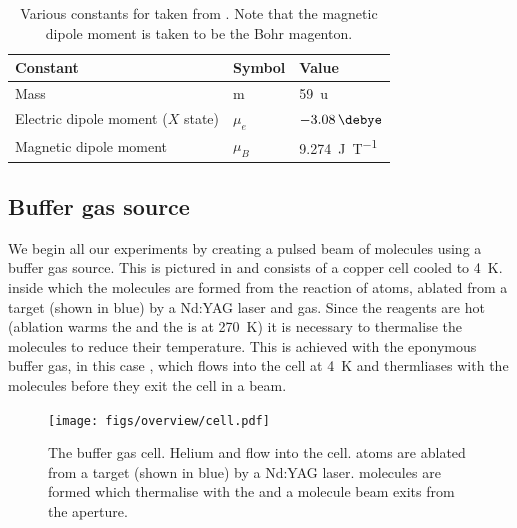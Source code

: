 \begin{table}
  \centering
\begin{tabular}{lll}
  \hline\hline
  Constant & Symbol & Value \\
  \hline
  Mass & m & \SI{59}{\amu}\\
  Electric dipole moment ($X$ state) & $\mu_e$ & $\SI{-3.08}{\debye}$\\
  Magnetic dipole moment & $\mu_B$ & \SI{9.274}{\joule\per\tesla} \\
 \hline
\end{tabular}
\caption{
  Various constants for \CaF{} taken from . Note that
  the magnetic dipole moment is taken to be the Bohr magenton.
  }
  \label{overview:table:constants}
\end{table}

\subsection{Buffer gas source}

We begin all our experiments by creating a pulsed beam of \CaF{} molecules
using a buffer gas source. This is pictured in 
and consists of a copper cell cooled to \SI{4}{\kelvin}. inside which the
\CaF{} molecules are formed from the reaction of \Ca{} atoms, ablated from a
target (shown in blue) by a Nd:YAG laser and \SFsix{} gas. Since the reagents
are hot (ablation warms the \Ca{} and the \SFsix{} is at \SI{270}{\kelvin}) it
is necessary to thermalise the molecules to reduce their temperature. This is
achieved with the eponymous buffer gas, in this case \He{}, which flows into
the cell at \SI{4}{\kelvin} and thermliases with the molecules before they exit
the cell in a beam.

\begin{figure}
  \centering
  \texttt{[image: figs/overview/cell.pdf]}
  \caption{The buffer gas cell. Helium and \SFsix flow into the cell. \Ca{}
  atoms are ablated from a target (shown in blue) by a Nd:YAG laser. \CaF{} molecules are
formed which thermalise with the \He{} and a molecule beam exits from the aperture.}
  \label{overview:fig:source}
\end{figure}

